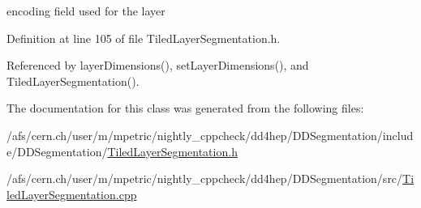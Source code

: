 encoding field used for the layer 



Definition at line 105 of file Tiled\+Layer\+Segmentation.\+h.



Referenced by layer\+Dimensions(), set\+Layer\+Dimensions(), and Tiled\+Layer\+Segmentation().



The documentation for this class was generated from the following files\+:\begin{DoxyCompactItemize}
\item 
/afs/cern.\+ch/user/m/mpetric/nightly\+\_\+cppcheck/dd4hep/\+D\+D\+Segmentation/include/\+D\+D\+Segmentation/\hyperlink{_tiled_layer_segmentation_8h}{Tiled\+Layer\+Segmentation.\+h}\item 
/afs/cern.\+ch/user/m/mpetric/nightly\+\_\+cppcheck/dd4hep/\+D\+D\+Segmentation/src/\hyperlink{_tiled_layer_segmentation_8cpp}{Tiled\+Layer\+Segmentation.\+cpp}\end{DoxyCompactItemize}
